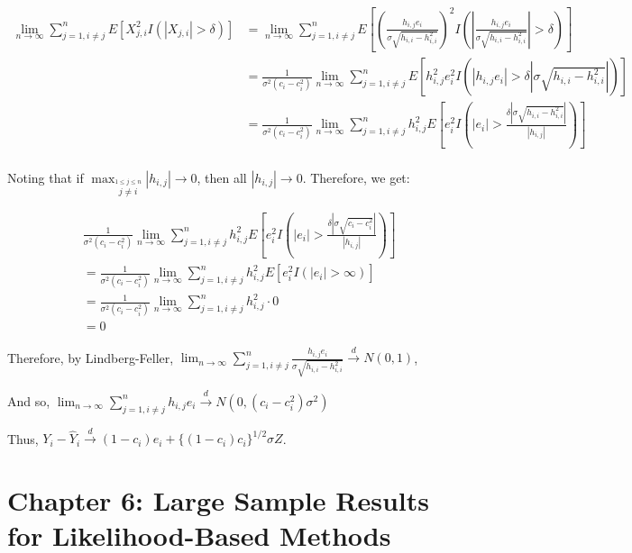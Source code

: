 \documentclass[
  letterpaper,
  DIV=11,
  numbers=noendperiod]{scrreprt}
\begin{document}
\[
\begin{aligned}
\lim_{n \to \infty} \sum_{j=1, i \neq j}^n  E\left[X_{j,i}^2 I(|X_{j,i}|> \delta)\right] 
&=\lim_{n \to \infty} \sum_{j=1, i \neq j}^n  E\left[\left(\frac{h_{i,j}e_i}{\sigma\sqrt{h_{i,i}-h_{i,i}^2}}\right)^2 I\left(\left|\frac{h_{i,j}e_i}{\sigma\sqrt{h_{i,i}-h_{i,i}^2}}\right| > \delta\right)\right] \\
&=\frac{1}{\sigma^2(c_i-c_i^2)}\lim_{n \to \infty} \sum_{j=1, i \neq j}^n E\left[h_{i,j}^2e_i^2 I\left(\left|h_{i,j}e_i\right| > \delta \left|\sigma\sqrt{h_{i,i}-h_{i,i}^2} \right| \right)\right] \\
&=\frac{1}{\sigma^2(c_i-c_i^2)}\lim_{n \to \infty} \sum_{j=1, i \neq j}^n h_{i,j}^2E\left[e_i^2 I\left(\left|e_i\right| > \frac{\delta \left|\sigma\sqrt{h_{i,i}-h_{i,i}^2} \right|}{|h_{i,j}|}\right)\right] \\
\end{aligned}
\]

Noting that if
\(\max_{\overset{1\leq j \leq n}{j\neq i}} |h_{i,j}| \to 0\), then all
\(|h_{i,j}| \to 0\). Therefore, we get:

\[\begin{aligned}
&\frac{1}{\sigma^2(c_i-c_i^2)}\lim_{n \to \infty} \sum_{j=1, i \neq j}^n h_{i,j}^2E\left[e_i^2 I\left(\left|e_i\right| > \frac{\delta \left|\sigma\sqrt{c_i-c_i^2} \right|}{|h_{i,j}|}\right)\right]\\
&=\frac{1}{\sigma^2(c_i-c_i^2)}\lim_{n \to \infty} \sum_{j=1, i \neq j}^n h_{i,j}^2E\left[e_i^2 I\left(\left|e_i\right| > \infty \right)\right] \\
&=\frac{1}{\sigma^2(c_i-c_i^2)}\lim_{n \to \infty} \sum_{j=1, i \neq j}^n h_{i,j}^2 \cdot 0 \\
&= 0
\end{aligned}\]

Therefore, by Lindberg-Feller,
\(\lim_{n \to \infty} \sum_{j=1, i \neq j}^n \frac{h_{i,j}e_i}{\sigma\sqrt{h_{i,i}-h_{i,i}^2}} \overset d \to N(0,1)\),

And so,
\(\lim_{n \to \infty} \sum_{j=1, i \neq j}^n h_{i,j}e_i \overset d \to N(0,(c_i -c_i^2)\sigma^2)\)

Thus,
\(Y_i- \hat{Y}_i \overset d \to (1-c_i)e_i+\{(1-c_i)c_i\}^{1/2}\sigma Z\).


\hypertarget{chapter-6-large-sample-results-for-likelihood-based-methods}{%
\chapter{Chapter 6: Large Sample Results for Likelihood-Based
Methods}\label{chapter-6-large-sample-results-for-likelihood-based-methods}}
\end{document}
